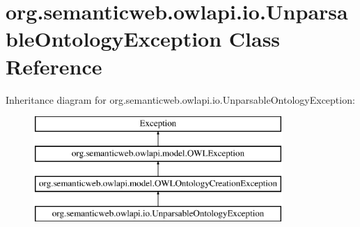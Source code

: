 \hypertarget{classorg_1_1semanticweb_1_1owlapi_1_1io_1_1_unparsable_ontology_exception}{\section{org.\-semanticweb.\-owlapi.\-io.\-Unparsable\-Ontology\-Exception Class Reference}
\label{classorg_1_1semanticweb_1_1owlapi_1_1io_1_1_unparsable_ontology_exception}
}
Inheritance diagram for org.\-semanticweb.\-owlapi.\-io.\-Unparsable\-Ontology\-Exception\-:\begin{figure}[H]
\begin{center}
\leavevmode
\includegraphics[height=4.000000cm]{classorg_1_1semanticweb_1_1owlapi_1_1io_1_1_unparsable_ontology_exception}
\end{center}
\end{figure}
